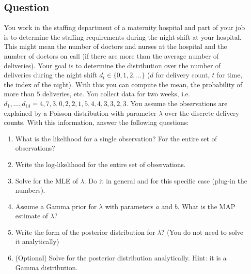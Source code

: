 \documentclass[12pt,a4paper]{article}
\begin{document}
\subsection{Question}
You work in the staffing department of a maternity hospital and part of your job is to determine the staffing requirements during the night shift at your hospital.  This might mean the number of doctors and nurses at the hospital and the number of doctors on call (if there are more than the average number of deliveries).  Your goal is to determine the distribution over the number of deliveries during the night shift $d_t \in \{0,1,2,\ldots\}$ ($d$ for delivery count, $t$ for time, the index of the night).  With this you can compute the mean, the probability of more than $5$ deliveries, etc.  You collect data for two weeks, i.e. $d_1, \ldots, d_{14} = 4, 7, 3, 0, 2, 2, 1, 5, 4, 4, 3, 3, 2, 3$.  You assume the observations are explained by a Poisson distribution with parameter $\lambda$ over the discrete delivery counts. With this information, answer the following questions:
%
\begin{enumerate}
  \item What is the likelihood for a single observation?  For the entire set of observations? 
  \item Write the log-likelihood for the entire set of observations.  
  \item Solve for the MLE of $\lambda$.  Do it in general and for this specific case (plug-in the numbers).
  \item Assume a Gamma prior for $\lambda$ with parameters $a$ and $b$.  What is the MAP estimate of $\lambda$?
  \item Write the form of the posterior distribution for $\lambda$? (You do not need to solve it analytically)
  \item (Optional) Solve for the posterior distribution analytically.  Hint: it is a Gamma distribution.
\end{enumerate}
\end{document}
